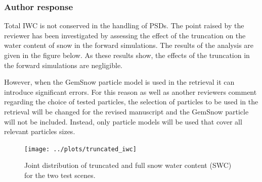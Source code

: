 \documentclass[11pt]{scrartcl}
\begin{document}
\subsubsection*{Author response}

Total IWC is not conserved in the handling of PSDs. The point raised by the reviewer has been
investigated by assessing the effect of the truncation on the water content of snow in the
forward simulations. The results of the analysis are given in the figure below. As these results
show, the effects of the truncation in the forward simulations are negligible.

However, when the GemSnow particle model is used in the retrieval it can
introduce significant errors. For this reason as well as another reviewers
comment regarding the choice of tested particles, the selection of particles to
be used in the retrieval will be changed for the revised manuscript and the
GemSnow particle will not be included. Instead, only particle models will be used
that cover all relevant particles sizes.

\begin{figure}[!hbpt]
  \begin{center}
  \texttt{[image: ../plots/truncated\_iwc]}
  \caption{Joint distribution of truncated and full snow water content (SWC) for the
    two test scenes.}
  \end{center}
\end{figure}



\end{document}
